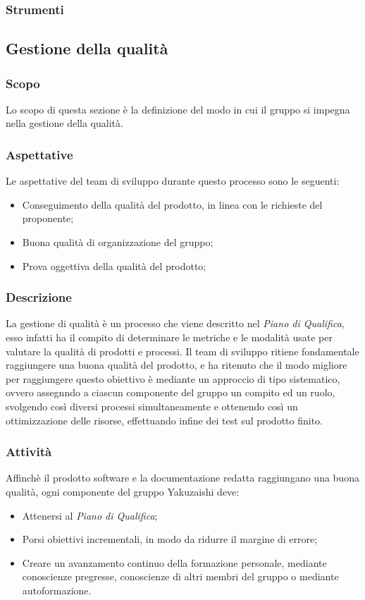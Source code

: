 \subsubsection{Strumenti}

\subsection{Gestione della qualità}\label{subsection: gestione_qualita}
\subsubsection{Scopo}
Lo scopo di questa sezione è la definizione del modo in cui il gruppo si impegna nella gestione della qualità.
\subsubsection{Aspettative}
Le aspettative del team di sviluppo durante questo processo sono le seguenti:
\begin {itemize}
    \item Conseguimento della qualità del prodotto, in linea con le richieste del proponente;
    \item Buona qualità di organizzazione del gruppo;
    \item Prova oggettiva della qualità del prodotto;
\end {itemize}
\subsubsection{Descrizione}
La gestione di qualità è un processo che viene descritto nel \textit{Piano di Qualifica}, esso infatti ha il compito di determinare le metriche e le modalità usate per valutare la qualità di prodotti e processi.
Il team di sviluppo ritiene fondamentale raggiungere una buona qualità del prodotto, e ha ritenuto che il modo migliore per raggiungere questo obiettivo è mediante un approccio di tipo sistematico, ovvero assegnndo a ciascun componente del gruppo un compito ed un ruolo, svolgendo così diversi processi simultaneamente e ottenendo così un ottimizzazione delle risorse, effettuando infine dei test sul prodotto finito. 
\subsubsection{Attività}
Affinchè il prodotto software e la documentazione redatta raggiungano una buona qualità, ogni componente del gruppo Yakuzaishi deve:
\begin{itemize}
    \item Attenersi al \textit{Piano di Qualifica};
    \item Porsi obiettivi incrementali, in modo da ridurre il margine di errore;
    \item Creare un avanzamento continuo della formazione personale, mediante conoscienze pregresse, conoscienze di altri membri del gruppo o mediante autoformazione. 
 \end {itemize}   
